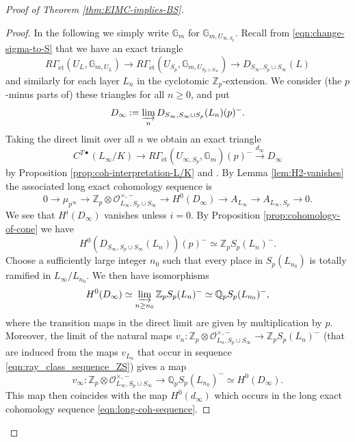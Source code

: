 \documentclass[12pt]{amsart}
\theoremstyle{plain}
\theoremstyle{remark}
\theoremstyle{definition}
\numberwithin{equation}{section}
\begin{document}
{\begin{proof}[Proof of Theorem \ref{thm:EIMC-implies-BS}]
\begin{proof}
In the following we simply write $\mathbb{G}_{m}$ for $\mathbb{G}_{m, U_{\infty, S_{p}}}$.
Recall from \eqref{eqn:change-sigma-to-S} that we have an exact triangle
\[
R\Gamma_{\mathrm{\acute{e}t}}(U_{L}, \mathbb{G}_{m, U_{L}}) \longrightarrow
R\Gamma_{\mathrm{\acute{e}t}}(U_{S_{p}}, \mathbb{G}_{m, U_{S_{p} \cup S_{\infty} }}) \longrightarrow D_{S_{\infty}, S_{p} \cup S_{\infty}}(L)
\]
and similarly for each layer $L_{n}$ in the cyclotomic ${\mathbb{Z}}_{p}$-extension.
We consider (the $p$-minus parts of) these triangles for all $n \geq 0$, and put
 \[
D_{\infty} := \varinjlim_{n} D_{S_{\infty},S_{\infty} \cup S_{p}}(L_{n})(p)^{-}.
\]
Taking the direct limit over all $n$ we obtain an exact triangle
\begin{equation} \label{eqn:first-exact-triangle}
C^{T \bullet}(L_{\infty}/K) \longrightarrow R\Gamma_{\mathrm{\acute{e}t}}(U_{\infty, S_{p}}, \mathbb{G}_{m})(p)^{-}
\stackrel{d_{\infty}}{\longrightarrow} D_{\infty}
\end{equation}
by Proposition \ref{prop:coh-interpretation-L/K} and \cite[Chapter III, Lemma 1.16]{MR559531}.
By Lemma \ref{lem:H2-vanishes} the associated long exact cohomology sequence is
\begin{equation} \label{eqn:long-coh-sequence}
0 \longrightarrow \mu_{p^{\infty}} \longrightarrow {\mathbb{Z}}_{p} \otimes \mathcal{O}_{L_{\infty}, S_{p} \cup S_{\infty}}^{\times,-} 
\longrightarrow H^{0}(D_{\infty}) \longrightarrow A_{L_{\infty}} \longrightarrow A_{L_{\infty}, S_{p}} \longrightarrow 0.
\end{equation}
We see that $H^{i}(D_{\infty})$ vanishes unless $i=0$. 
By Proposition \ref{prop:cohomology-of-cone} we have
\[
H^{0}(D_{S_{\infty},S_{p} \cup S_{\infty}}(L_{n}))(p)^{-} \simeq {\mathbb{Z}}_{p} S_{p}(L_{n})^{-}.
\]
Choose a sufficiently large integer $n_{0}$ such that every place in $S_{p}(L_{n_{0}})$ is totally ramified in $L_{\infty} / L_{n_{0}}$.
We then have isomorphisms
\begin{equation} \label{eqn:D_infty-cohomology}
H^{0}(D_{\infty}) \simeq \varinjlim_{n \geq n_{0}} {\mathbb{Z}}_{p} S_{p}(L_{n})^{-} \simeq {\mathbb{Q}}_{p} S_{p}(L_{n_{0}})^{-},
\end{equation}
where the transition maps in the direct limit are given by multiplication by $p$.
Moreover, the limit of the natural maps $v_{n}: {\mathbb{Z}}_{p} \otimes \mathcal{O}_{L_{n}, S_{p} \cup S_{\infty}}^{\times,-} \rightarrow {\mathbb{Z}}_{p} S_{p}(L_{n})^{-}$
(that are induced from the maps $v_{L_{n}}$ that occur in sequence \eqref{eqn:ray_class_sequence_ZS}) gives a map
\[
v_{\infty}: {\mathbb{Z}}_{p} \otimes \mathcal{O}_{L_{\infty}, S_{p} \cup S_{\infty}}^{\times,-} \longrightarrow {\mathbb{Q}}_{p} S_{p}(L_{n_{0}})^{-} \simeq H^{0}(D_{\infty}).
\]
This map then coincides with the map $H^0(d_{\infty})$ which occurs in the long exact cohomology sequence \eqref{eqn:long-coh-sequence}.


\end{proof}
\end{proof}}
\end{document}
